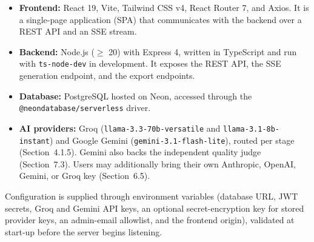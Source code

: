 \documentclass[12pt,a4paper,oneside]{report}
\begin{document}
\begin{itemize}[leftmargin=*,nosep]
  \item \textbf{Frontend:} React 19, Vite, Tailwind CSS v4, React Router 7, and Axios. It is a single-page application (SPA) that communicates with the backend over a REST API and an SSE stream.
  \item \textbf{Backend:} Node.js ($\geq$ 20) with Express 4, written in TypeScript and run with \texttt{ts-node-dev} in development. It exposes the REST API, the SSE generation endpoint, and the export endpoints.
  \item \textbf{Database:} PostgreSQL hosted on Neon, accessed through the \texttt{@neondatabase/serverless} driver.
  \item \textbf{AI providers:} Groq (\texttt{llama-3.3-70b-versatile} and \texttt{llama-3.1-8b-instant}) and Google Gemini (\texttt{gemini-3.1-flash-lite}), routed per stage (Section~4.1.5). Gemini also backs the independent quality judge (Section~7.3). Users may additionally bring their own Anthropic, OpenAI, Gemini, or Groq key (Section~6.5).
\end{itemize}

Configuration is supplied through environment variables (database URL, JWT secrets, Groq and Gemini API keys, an optional secret-encryption key for stored provider keys, an admin-email allowlist, and the frontend origin), validated at start-up before the server begins listening.
\end{document}
